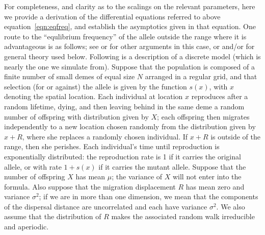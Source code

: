 \documentclass{article}
\begin{document}
For completeness, and clarity as to the scalings on the relevant parameters,
here we provide a derivation of the differential equations referred to above equation~\eqref{eqn:eqfreq},
and establish the asymptotics given in that equation.
One route to the ``equlibrium frequency'' of the allele outside the range where it is advantageous is as follows;
see \citet{slatkin1973geneflow} or \citet{barton1987establishment,pollak1966survival} for other arguments in this case, 
or \citet{etheridge2000introduction} and/or \citet{dawson1993measurevalued} for general theory used below.
Following is a description of a discrete model (which is nearly the one we simulate from).
Suppose that the population is composed of a finite number of small demes of equal size $N$ arranged in a regular grid,
and that selection (for or against) the allele is given by the function $s(x)$, with $x$ denoting the spatial location.
Each individual at location $x$ reproduces after a random lifetime,
dying, and then leaving behind in the same deme a random number of offspring with distribution given by $X$;
each offspring then migrates independently to a new location chosen randomly from the distribution given by $x+R$,
where she replaces a randomly chosen individual.
If $x+R$ is outside of the range, then she perishes.
Each individual's time until reproduction is exponentially distributed:
the reproduction rate is 1 if it carries the original allele, or with rate $1+s(x)$ if it carries the mutant allele.
Suppose that the number of offspring $X$ has mean $\mu$; the variance of $X$ will not enter into the formula.
Also suppose that the migration displacement $R$ has mean zero and variance $\sigma^2$;
if we are in more than one dimension, we mean that the components of the dispersal distance are uncorrelated
and each have variance $\sigma^2$.
We also assume that the distribution of $R$ makes the associated random walk irreducible and aperiodic.
\end{document}
